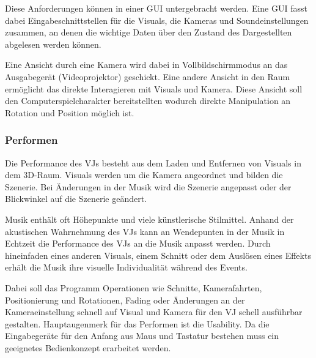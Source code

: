Diese Anforderungen k\"onnen in einer GUI untergebracht werden. Eine GUI fasst dabei Eingabeschnittstellen f\"ur die Visuals,
die Kameras und Soundeinstellungen zusammen, an denen die wichtige Daten \"uber den Zustand des Dargestellten abgelesen
werden k\"onnen.

Eine Ansicht durch eine Kamera wird dabei in Vollbildschirmmodus an das Ausgabeger\"at (Videoprojektor) geschickt. Eine
andere Ansicht in den Raum erm\"oglicht das direkte Interagieren mit Visuals und Kamera. Diese Ansicht soll den
Computerspielcharakter bereitstellten wodurch direkte Manipulation an Rotation und Position m\"oglich ist.





\subsubsection{Performen}

Die Performance des VJs besteht aus dem Laden und Entfernen von Visuals in dem 3D-Raum. Visuals werden um die
Kamera angeordnet und bilden die Szenerie. Bei \"Anderungen in der Musik wird die Szenerie angepasst oder der
Blickwinkel auf die Szenerie ge\"andert.

Musik enth\"alt oft H\"ohepunkte und viele k\"unstlerische Stilmittel.
Anhand der akustischen Wahrnehmung des VJs kann an Wendepunten in der Musik in Echtzeit die Performance des VJs
an die Musik anpasst werden. Durch hineinfaden eines anderen Visuals, einem Schnitt oder dem Ausl\"osen eines
Effekts erh\"alt die Musik ihre visuelle Individualit\"at w\"ahrend des Events.

Dabei soll das Programm Operationen wie Schnitte, Kamerafahrten, Positionierung und Rotationen, Fading oder
\"Anderungen an der Kameraeinstellung schnell auf Visual und Kamera f\"ur den VJ schell ausf\"uhrbar gestalten.
Hauptaugenmerk f\"ur das Performen ist die Usability. Da die Eingabeger\"ate f\"ur den Anfang aus
Maus und Tastatur bestehen muss ein geeignetes Bedienkonzept erarbeitet werden.

